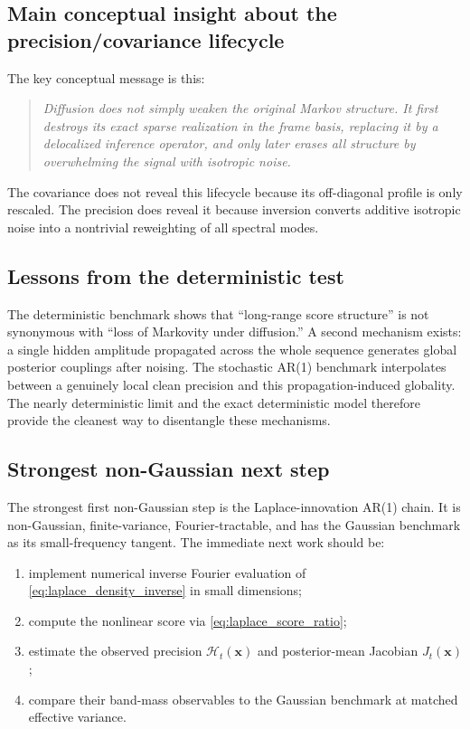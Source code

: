 \documentclass[11pt]{article}
\begin{document}
\subsection{Main conceptual insight about the precision/covariance lifecycle}

The key conceptual message is this:
\begin{quote}
\emph{Diffusion does not simply weaken the original Markov structure. It first destroys its exact sparse realization in the frame basis, replacing it by a delocalized inference operator, and only later erases all structure by overwhelming the signal with isotropic noise.}
\end{quote}
The covariance does not reveal this lifecycle because its off-diagonal profile is only rescaled. The precision does reveal it because inversion converts additive isotropic noise into a nontrivial reweighting of all spectral modes.

\subsection{Lessons from the deterministic test}

The deterministic benchmark shows that ``long-range score structure'' is not synonymous with ``loss of Markovity under diffusion.'' A second mechanism exists: a single hidden amplitude propagated across the whole sequence generates global posterior couplings after noising. The stochastic AR(1) benchmark interpolates between a genuinely local clean precision and this propagation-induced globality. The nearly deterministic limit and the exact deterministic model therefore provide the cleanest way to disentangle these mechanisms.

\subsection{Strongest non-Gaussian next step}

The strongest first non-Gaussian step is the Laplace-innovation AR(1) chain. It is non-Gaussian, finite-variance, Fourier-tractable, and has the Gaussian benchmark as its small-frequency tangent. The immediate next work should be:
\begin{enumerate}[label=(\alph*),leftmargin=1cm]
\item implement numerical inverse Fourier evaluation of \eqref{eq:laplace_density_inverse} in small dimensions;
\item compute the nonlinear score via \eqref{eq:laplace_score_ratio};
\item estimate the observed precision $\mathcal H_t(\mathbf x)$ and posterior-mean Jacobian $J_t(\mathbf x)$;
\item compare their band-mass observables to the Gaussian benchmark at matched effective variance.
\end{enumerate}
\end{document}
